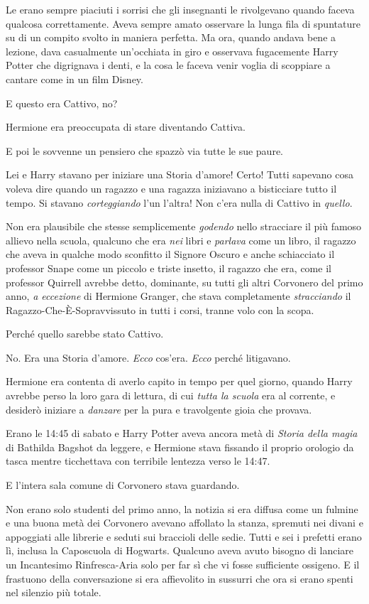 Le erano sempre piaciuti i sorrisi che gli insegnanti le rivolgevano quando faceva qualcosa correttamente. Aveva sempre amato osservare la lunga fila di spuntature su di un compito svolto in maniera perfetta. Ma ora, quando andava bene a lezione, dava casualmente un’occhiata in giro e osservava fugacemente Harry Potter che digrignava i denti, e la cosa le faceva venir voglia di scoppiare a cantare come in un film Disney.

E questo era Cattivo, no?

Hermione era preoccupata di stare diventando Cattiva.

E poi le sovvenne un pensiero che spazzò via tutte le sue paure.

Lei e Harry stavano per iniziare una Storia d’amore! Certo! Tutti sapevano cosa voleva dire quando un ragazzo e una ragazza iniziavano a bisticciare tutto il tempo. Si stavano \textit{corteggiando} l’un l’altra! Non c’era nulla di Cattivo in \textit{quello}.

Non era plausibile che stesse semplicemente \textit{godendo} nello stracciare il più famoso allievo nella scuola, qualcuno che era \textit{nei} libri e \textit{parlava} come un libro, il ragazzo che aveva in qualche modo sconfitto il Signore Oscuro e anche schiacciato il professor Snape come un piccolo e triste insetto, il ragazzo che era, come il professor Quirrell avrebbe detto, dominante, su tutti gli altri Corvonero del primo anno, \textit{a eccezione} di Hermione Granger, che stava completamente \textit{stracciando} il Ragazzo-Che-È-Sopravvissuto in tutti i corsi, tranne volo con la scopa.

Perché quello sarebbe stato Cattivo.

No. Era una Storia d’amore. \textit{Ecco} cos’era. \textit{Ecco} perché litigavano.

Hermione era contenta di averlo capito in tempo per quel giorno, quando Harry avrebbe perso la loro gara di lettura, di cui \textit{tutta la scuola} era al corrente, e desiderò iniziare a \textit{danzare} per la pura e travolgente gioia che provava.

Erano le 14:45 di sabato e Harry Potter aveva ancora metà di \textit{Storia della magia} di Bathilda Bagshot da leggere, e Hermione stava fissando il proprio orologio da tasca mentre ticchettava con terribile lentezza verso le 14:47.

E l’intera sala comune di Corvonero stava guardando.

Non erano solo studenti del primo anno, la notizia si era diffusa come un fulmine e una buona metà dei Corvonero avevano affollato la stanza, spremuti nei divani e appoggiati alle librerie e seduti sui braccioli delle sedie. Tutti e sei i prefetti erano lì, inclusa la Caposcuola di Hogwarts. Qualcuno aveva avuto bisogno di lanciare un Incantesimo Rinfresca-Aria solo per far sì che vi fosse sufficiente ossigeno. E il frastuono della conversazione si era affievolito in sussurri che ora si erano spenti nel silenzio più totale.

